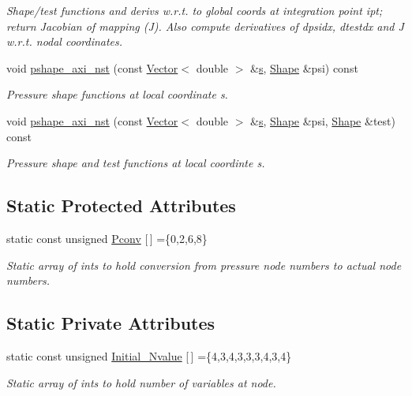 \begin{DoxyCompactItemize}
\begin{DoxyCompactList}\small\item\em Shape/test functions and derivs w.\+r.\+t. to global coords at integration point ipt; return Jacobian of mapping (J). Also compute derivatives of dpsidx, dtestdx and J w.\+r.\+t. nodal coordinates. \end{DoxyCompactList}\item 
void \hyperlink{classoomph_1_1GeneralisedNewtonianAxisymmetricQTaylorHoodElement_a66364d5ce2c8dd8770066ef295ec9427}{pshape\+\_\+axi\+\_\+nst} (const \hyperlink{classoomph_1_1Vector}{Vector}$<$ double $>$ \&\hyperlink{cfortran_8h_ab7123126e4885ef647dd9c6e3807a21c}{s}, \hyperlink{classoomph_1_1Shape}{Shape} \&psi) const
\begin{DoxyCompactList}\small\item\em Pressure shape functions at local coordinate s. \end{DoxyCompactList}\item 
void \hyperlink{classoomph_1_1GeneralisedNewtonianAxisymmetricQTaylorHoodElement_a1a4c61c01154cc2e95da02ba03495b44}{pshape\+\_\+axi\+\_\+nst} (const \hyperlink{classoomph_1_1Vector}{Vector}$<$ double $>$ \&\hyperlink{cfortran_8h_ab7123126e4885ef647dd9c6e3807a21c}{s}, \hyperlink{classoomph_1_1Shape}{Shape} \&psi, \hyperlink{classoomph_1_1Shape}{Shape} \&test) const
\begin{DoxyCompactList}\small\item\em Pressure shape and test functions at local coordinte s. \end{DoxyCompactList}\end{DoxyCompactItemize}
\subsection*{Static Protected Attributes}
\begin{DoxyCompactItemize}
\item 
static const unsigned \hyperlink{classoomph_1_1GeneralisedNewtonianAxisymmetricQTaylorHoodElement_a42e06643d26b39a2683f3fa7ee696792}{Pconv} \mbox{[}$\,$\mbox{]} =\{0,2,6,8\}
\begin{DoxyCompactList}\small\item\em Static array of ints to hold conversion from pressure node numbers to actual node numbers. \end{DoxyCompactList}\end{DoxyCompactItemize}
\subsection*{Static Private Attributes}
\begin{DoxyCompactItemize}
\item 
static const unsigned \hyperlink{classoomph_1_1GeneralisedNewtonianAxisymmetricQTaylorHoodElement_a7fa9ab4452c8892c51652f71142736f6}{Initial\+\_\+\+Nvalue} \mbox{[}$\,$\mbox{]} =\{4,3,4,3,3,3,4,3,4\}
\begin{DoxyCompactList}\small\item\em Static array of ints to hold number of variables at node. \end{DoxyCompactList}\end{DoxyCompactItemize}
